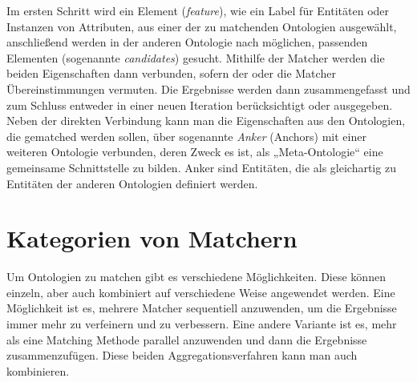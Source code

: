 	Im ersten Schritt wird ein Element (\textit{feature}), wie ein Label für
	Entitäten oder Instanzen von Attributen, aus einer der zu matchenden Ontologien ausgewählt,
	anschließend werden in der anderen Ontologie nach möglichen, passenden
	Elementen (sogenannte \textit{candidates}) gesucht. Mithilfe der Matcher werden
	die beiden Eigenschaften dann verbunden, sofern der oder die Matcher Übereinstimmungen vermuten. Die Ergebnisse werden dann zusammengefasst und zum Schluss entweder in einer neuen Iteration berücksichtigt oder ausgegeben. \cite{Hoo14}\\
	Neben der direkten Verbindung kann man die Eigenschaften aus den Ontologien, die
	gematched werden sollen, über sogenannte \textit{Anker} (Anchors) mit einer
	weiteren Ontologie verbunden, deren Zweck es ist, als „Meta-Ontologie“ eine gemeinsame Schnittstelle zu bilden. Anker sind Entitäten, die als gleichartig zu Entitäten der anderen Ontologien definiert werden. \cite{Hoo14}
	
	\section{Kategorien von Matchern}
	\label{MatcherKategorien}
	Um Ontologien zu matchen gibt es verschiedene Möglichkeiten. Diese können einzeln, aber auch kombiniert auf verschiedene Weise angewendet werden. Eine Möglichkeit ist es, mehrere Matcher sequentiell anzuwenden, um die Ergebnisse immer mehr zu verfeinern und zu verbessern. Eine andere Variante ist es, mehr als eine Matching Methode parallel anzuwenden und dann die Ergebnisse zusammenzufügen. Diese beiden Aggregationsverfahren kann man auch kombinieren. \cite{Hoo14}
	
